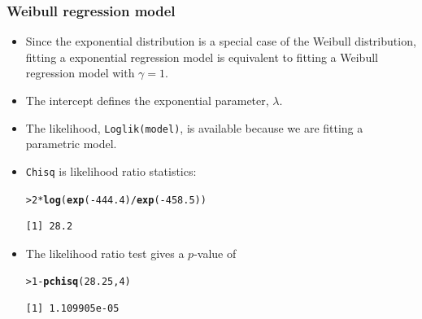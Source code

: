 \documentclass[10pt]{beamer}\usepackage[]{graphicx}\usepackage[]{color}
\makeatletter
\newcommand{\hlnum}[1]{\textcolor[rgb]{0.686,0.059,0.569}{#1}}%
\newcommand{\hlopt}[1]{\textcolor[rgb]{0,0,0}{#1}}%
\newcommand{\hlstd}[1]{\textcolor[rgb]{0.345,0.345,0.345}{#1}}%
\newcommand{\hlkwd}[1]{\textcolor[rgb]{0.737,0.353,0.396}{\textbf{#1}}}%
\newenvironment{kframe}{%
 \def\at@end@of@kframe{}%
 \ifinner\ifhmode%
  \def\at@end@of@kframe{\end{minipage}}%
  \begin{minipage}{\columnwidth}%
 \fi\fi%
 \def\FrameCommand##1{\hskip\@totalleftmargin \hskip-\fboxsep
 \colorbox{shadecolor}{##1}\hskip-\fboxsep
     \hskip-\linewidth \hskip-\@totalleftmargin \hskip\columnwidth}%
 \MakeFramed {\advance\hsize-\width
   \@totalleftmargin\z@ \linewidth\hsize
   \@setminipage}}%
 {\par\unskip\endMakeFramed%
 \at@end@of@kframe}
\newenvironment{knitrout}{}{} %
\renewenvironment{knitrout}{\setlength{\topsep}{-.2mm}}{}
\newcommand{\code}[1]{{\texttt{#1}}}
\makeatother
\begin{document}
\begin{frame}[fragile]
  \frametitle{Weibull regression model}
  \begin{itemize}
  \item Since the exponential distribution is a special case of the Weibull distribution,
    fitting a exponential regression model is equivalent to fitting a Weibull regression model with $\gamma = 1$.
  \item The intercept defines the exponential parameter, $\lambda$.
  \item The likelihood, \code{Loglik(model)}, is available because we are fitting a parametric model.
  \item \code{Chisq} is likelihood ratio statistics:
\begin{knitrout}\scriptsize
{}\color{fgcolor}\begin{kframe}
\begin{alltt}
\hlstd{> }\hlnum{2} \hlopt{*} \hlkwd{log}\hlstd{(}\hlkwd{exp}\hlstd{(}\hlopt{-}\hlnum{444.4}\hlstd{)} \hlopt{/} \hlkwd{exp}\hlstd{(}\hlopt{-}\hlnum{458.5}\hlstd{))}
\end{alltt}
\begin{verbatim}
[1] 28.2
\end{verbatim}
\end{kframe}
\end{knitrout}
\item The likelihood ratio test gives a $p$-value of
\begin{knitrout}\scriptsize
{}\color{fgcolor}\begin{kframe}
\begin{alltt}
\hlstd{> }\hlnum{1} \hlopt{-} \hlkwd{pchisq}\hlstd{(}\hlnum{28.25}\hlstd{,} \hlnum{4}\hlstd{)}
\end{alltt}
\begin{verbatim}
[1] 1.109905e-05
\end{verbatim}
\end{kframe}
\end{knitrout}
  \end{itemize}
\end{frame}
\end{document}
